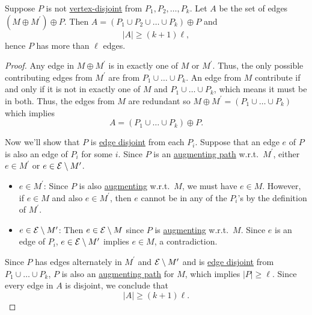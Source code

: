 \begin{lemma}\label{lma:lec25-4}
	Suppose \(P\) is not \hyperref[def:vertex-independent]{vertex-disjoint} from \(P_1, P_2, \ldots , P_k \). Let \(A\) be the set of edges \((M\oplus M^\prime )\oplus P\). Then \(A = (P_1\cup P_2 \cup \ldots \cup P_k )\oplus P\) and
	\[
		\left\vert A \right\vert \geq (k+1)\ell,
	\]
	hence \(P\) has more than \(\ell \) edges.
\end{lemma}
\begin{proof}
	Any edge in \(M\oplus M^\prime \) is in exactly one of \(M\) or \(M^\prime \). Thus, the only possible contributing edges from \(M^\prime \) are from \(P_1 \cup \ldots  \cup P_k\). An edge from \(M\) contribute if and only if it is not in exactly one of \(M\) and \(P_1 \cup \ldots  \cup P_k\), which means it must be in both. Thus, the edges from \(M\) are redundant so \(M\oplus M^\prime = (P_1 \cup \ldots \cup P_k )\) which implies
	\[
		A = (P_1 \cup \ldots  \cup P_k)\oplus P.
	\]

	Now we'll show that \(P\) is \hyperref[def:edge-independent]{edge disjoint} from each \(P_i\). Suppose that an edge \(e\) of \(P\) is also an edge of \(P_i\) for some \(i\). Since \(P\) is an \hyperref[def:augmenting-path]{augmenting path} w.r.t.\ \(M^\prime \), either \(e\in M^\prime \) or \(e\in \mathcal{\MakeUppercase{E}} \setminus M^\prime \).
	\begin{itemize}
		\item \(e\in M^\prime \): Since \(P\) is also \hyperref[def:augmenting-path]{augmenting} w.r.t.\ \(M\), we must have \(e\in M\). However, if \(e\in M\) and also \(e\in M^\prime \), then \(e\) cannot be in any of the \(P_i\)'s by the definition of \(M^\prime \).
		\item \(e\in \mathcal{\MakeUppercase{e}} \setminus M^\prime \): Then \(e\in \mathcal{\MakeUppercase{e}} \setminus M\) since \(P\) is \hyperref[def:augmenting-path]{augmenting} w.r.t.\ \(M\). Since \(e\) is an edge of \(P_i\), \(e\in \mathcal{\MakeUppercase{e}} \setminus M^\prime \) implies \(e\in M\), a contradiction.
	\end{itemize}

	Since \(P\) has edges alternately in \(M^\prime \) and \(\mathcal{\MakeUppercase{e}} \setminus M^\prime \) and is \hyperref[def:edge-independent]{edge disjoint} from \(P_1 \cup \ldots  \cup P_k\), \(P\) is also an \hyperref[def:augmenting-path]{augmenting path} for \(M\), which implies \(\left\vert P \right\vert \geq \ell \). Since every edge in \(A\) is disjoint, we conclude that
	\[
		\left\vert A \right\vert \geq (k + 1) \ell .
	\]
\end{proof}

